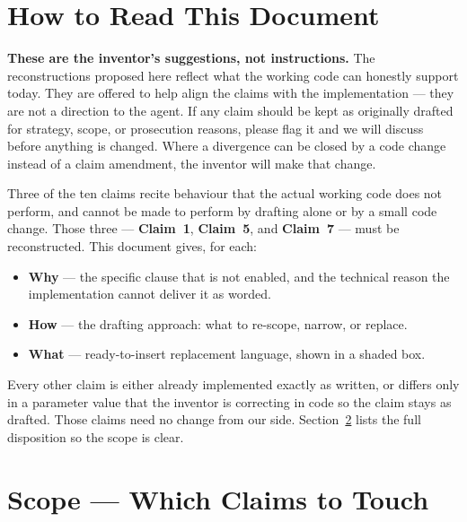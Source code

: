 \documentclass[12pt,a4paper]{article}
\newcommand{\clm}[1]{\textbf{Claim~#1}}
\begin{document}
\section{How to Read This Document}

\begin{notebox}
\textbf{These are the inventor's suggestions, not instructions.} The reconstructions proposed
here reflect what the working code can honestly support today. They are offered to help align
the claims with the implementation --- they are not a direction to the agent. If any claim
should be kept as originally drafted for strategy, scope, or prosecution reasons, please flag
it and we will discuss before anything is changed. Where a divergence can be closed by a code
change instead of a claim amendment, the inventor will make that change.
\end{notebox}

Three of the ten claims recite behaviour that the actual working code does not perform,
and cannot be made to perform by drafting alone or by a small code change. Those three ---
\clm{1}, \clm{5}, and \clm{7} --- must be reconstructed. This document gives, for each:

\begin{itemize}[leftmargin=1.4em,itemsep=2pt,topsep=2pt]
  \item \textbf{Why} --- the specific clause that is not enabled, and the technical reason
        the implementation cannot deliver it as worded.
  \item \textbf{How} --- the drafting approach: what to re-scope, narrow, or replace.
  \item \textbf{What} --- ready-to-insert replacement language, shown in a shaded box.
\end{itemize}

Every other claim is either already implemented exactly as written, or differs only in a
parameter value that the inventor is correcting in code so the claim stays as drafted.
Those claims need no change from our side. Section~\ref{sec:scope} lists the full
disposition so the scope is clear.

\section{Scope --- Which Claims to Touch}\label{sec:scope}
\end{document}
